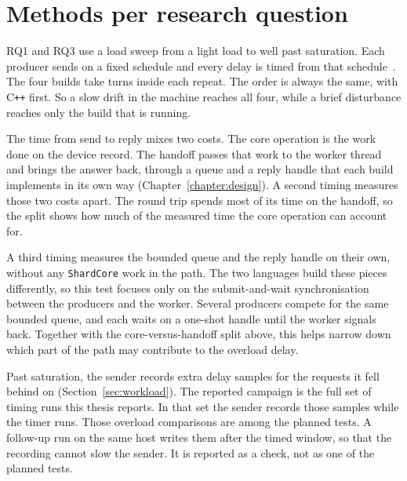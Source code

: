 \documentclass[english,oneside,a4paper,censored,csm,software-track-2020]{HYthesisML}
\begin{document}
\section[Methods per research question]{Methods per research question}\label{sec:methodbrief}
RQ1 and RQ3 use a load sweep from a light load to well past saturation. Each
producer sends on a fixed schedule and every delay is timed from that
schedule~\cite{schroeder2006openclosed}. The four builds take turns inside each
repeat. The order is always the same, with C\texttt{++} first. So a slow drift in
the machine reaches all four, while a brief disturbance reaches only the build
that is running.

The time from send to reply mixes two costs. The core operation is the work
done on the device record. The handoff passes that work to the worker thread
and brings the answer back, through a queue and a reply handle that each build
implements in its own way (Chapter~\ref{chapter:design}). A second timing
measures those two costs apart. The round trip spends most of its time on the
handoff, so the split shows how much of the measured time the core operation
can account for. 

A third timing measures the bounded queue and the reply handle on their own, 
without any \texttt{ShardCore} work in the path. 
The two languages build these pieces differently, so this test focuses only on 
the submit-and-wait synchronisation between the producers and the worker. 
Several producers compete for the same bounded queue, and each waits on a
one-shot handle until the worker signals back. Together with the core-versus-handoff
split above, this helps narrow down which part of the path may contribute to the 
overload delay.

Past saturation, the sender records extra delay samples for the requests it
fell behind on (Section~\ref{sec:workload}). The reported campaign is the full
set of timing runs this thesis reports. In that set the sender records those
samples while the timer runs. Those overload comparisons are among the planned
tests. A follow-up run on the same host writes them after the timed
window, so that the recording cannot slow the sender. It is reported as a
check, not as one of the planned tests.
\end{document}

